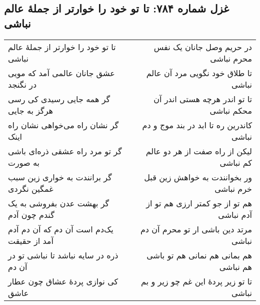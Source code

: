 \begin{center}
\section*{غزل شماره ۷۸۴: تا تو خود را خوارتر از جملهٔ عالم نباشی}
\label{sec:784}
\begin{longtable}{l p{0.5cm} r}
تا تو خود را خوارتر از جملهٔ عالم نباشی
&&
در حریم وصل جانان یک نفس محرم نباشی
\\
عشق جانان عالمی آمد که مویی در نگنجد
&&
تا طلاق خود نگویی مرد آن عالم نباشی
\\
گر همه جایی رسیدی کی رسی هرگز به جایی
&&
تا تو اندر هرچه هستی اندر آن محکم نباشی
\\
گر نشان راه می‌خواهی نشان راه اینک
&&
کاندرین ره تا ابد در بند موج و دم نباشی
\\
گر تو مرد راه عشقی ذره‌ای باشی به صورت
&&
لیکن از راه صفت از هر دو عالم کم نباشی
\\
گر برانندت به خواری زین سبب غمگین نگردی
&&
ور بخوانندت به خواهش زین قبل خرم نباشی
\\
گر بهشت عدن بفروشی به یک گندم چون آدم
&&
هم تو از جو کمتر ارزی هم تو از آدم نباشی
\\
یک‌دم است آن دم که آن دم آدم آمد از حقیقت
&&
مرتد دین باشی ار تو محرم آن دم نباشی
\\
ذره در سایه نباشد تا نباشی تو در آن دم
&&
هم بمانی هم نمانی هم تو باشی هم نباشی
\\
کی نوازی پردهٔ عشاق چون عطار عاشق
&&
تا تو زیر پردهٔ این غم چو زیر و بم نباشی
\\
\end{longtable}
\end{center}
